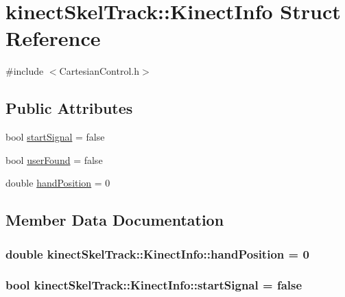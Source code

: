 \hypertarget{structkinectSkelTrack_1_1KinectInfo}{}\section{kinect\+Skel\+Track\+:\+:Kinect\+Info Struct Reference}
\label{structkinectSkelTrack_1_1KinectInfo}


{\ttfamily \#include $<$Cartesian\+Control.\+h$>$}

\subsection*{Public Attributes}
\begin{DoxyCompactItemize}
\item 
bool \hyperlink{structkinectSkelTrack_1_1KinectInfo_a5c96d5e337139c1cc68f3d3ebddb388b}{start\+Signal} = false
\item 
bool \hyperlink{structkinectSkelTrack_1_1KinectInfo_a772bf02b53092fd2424849292b2c3c1d}{user\+Found} = false
\item 
double \hyperlink{structkinectSkelTrack_1_1KinectInfo_a22f3400cf45556b243dcf94bcf4392df}{hand\+Position} = 0
\end{DoxyCompactItemize}


\subsection{Member Data Documentation}
\subsubsection[{\texorpdfstring{hand\+Position}{handPosition}}]{\setlength{\rightskip}{0pt plus 5cm}double kinect\+Skel\+Track\+::\+Kinect\+Info\+::hand\+Position = 0}\hypertarget{structkinectSkelTrack_1_1KinectInfo_a22f3400cf45556b243dcf94bcf4392df}{}\label{structkinectSkelTrack_1_1KinectInfo_a22f3400cf45556b243dcf94bcf4392df}
\subsubsection[{\texorpdfstring{start\+Signal}{startSignal}}]{\setlength{\rightskip}{0pt plus 5cm}bool kinect\+Skel\+Track\+::\+Kinect\+Info\+::start\+Signal = false}\hypertarget{structkinectSkelTrack_1_1KinectInfo_a5c96d5e337139c1cc68f3d3ebddb388b}{}\label{structkinectSkelTrack_1_1KinectInfo_a5c96d5e337139c1cc68f3d3ebddb388b}
